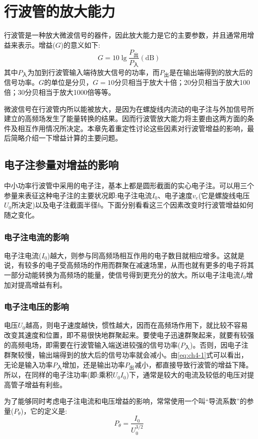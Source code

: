 \chapter{行波管的放大能力} \label{ch4}
行波管是一种放大微波信号的器件，因此放大能力是它的主要参数，并且通常用增益来表示。增益($ G $)的意义如下:
\begin{equation} \label{eq:ch4-1}
	G=10\lg\frac{P_\text{出}}{P_\text{入}}(\textrm{dB})
\end{equation}
其中$ P_\textrm{入} $为加到行波管输入端待放大信号的功率，而$ P_\text{出} $是在输出端得到的放大后的信号功率。$ G $的单位是分贝，$ G=10 $分贝相当于放大十倍；20分贝相当于放大100倍；30分贝相当于放大1000倍等等。

微波信号在行波管内所以能被放大，是因为在螺旋线内流动的电子注与外加信号所建立的高频场发生了能量转换的结果。因而行波管放大能力将主要由这两方面的条件及相互作用情况所决定。本章先着重定性讨论这些因素对行波管增益的影响，最后简略介绍一下增益计算的主要问题。
\section{电子注参量对增益的影响}
中小功率行波管中采用的电子注，基本上都是圆形截面的实心电子注。可以用三个参量来表征这种电子注的主要状况即:电子注电流$ I_0 $、电子速度$ v_e $(它是螺旋线电压$ U_0 $所决定)以及电子注截面半径$ b $。下面分别看看这三个因素改变时行波管增益如何随之变化。
\subsection{电子注电流的影响}	
	电子注电流($ I_0 $)越大，则参与同高频场相互作用的电子数目就相应增多。这就是说，有较多的电子受高频场的作用而群聚在减速场里，从而也就有更多的电子将其一部分动能转换为高频场的能量，使信号得到更充分的放大。所以电子注电流$ I_0 $增加对提高增益有利。
\subsection{电子注电压的影响}	
	电压$ U_0 $越高，则电子速度越快，惯性越大，因而在高频场作用下，就比较不容易改变其速度和位置，即不易很快地群聚起来。要使电子迅速群聚起来，就要有较强的高频电场，即需要在行波管输入端送进较强的信号功率($ P_\text{入} $)。否则，因电子注群聚较慢，输出端得到的放大后的信号功率就会减小。由\ref{eq:ch4-1}式可以看出，无论是输入功率$ P_\text{入} $增加，还是输出功率$ P_\text{出} $减小，都直接导致行波管的增益下降。所以，在同样的电子注功率(即:乘积$ U_0I_0 $)下，通常是较大的电流及较低的电压对提高管子增益有利些。	
	
	为了能够同时考虑电子注电流和电压增益的影响，常常使用一个叫“导流系数”的参量($ P_\theta $)，它的定义是:
	\begin{equation} \label{eq:ch4-2}
		P_\theta = \frac{I_0}{U_0^{3/2}}
	\end{equation}
	
